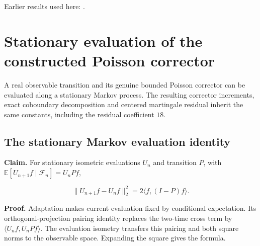 \documentclass[11pt,a4paper]{report}
\begin{document}
Earlier results used here: \cite[Section~3.26.3]{LangevinLean2026ULASC}.
\section{\texorpdfstring{Stationary evaluation of the constructed Poisson corrector}{Stationary evaluation of the constructed Poisson corrector}}
\label{proof-module-WassersteinMixing-PoissonProcess-lean}


A real observable transition and its genuine bounded Poisson corrector can be evaluated along a stationary Markov process. The resulting corrector increments, exact coboundary decomposition and centered martingale residual inherit the same constants, including the residual coefficient \(18\).

\subsection{\texorpdfstring{The stationary Markov evaluation identity}{The stationary Markov evaluation identity}}
\label{report-step-WassersteinMixing-PoissonProcess-lean-1}


\textbf{Claim.} For stationary isometric evaluations \(U_n\) and transition \(P\), with \(\mathbb E[U_{n+1}f\mid\mathcal F_n]=U_nPf\),

\[\|U_{n+1}f-U_nf\|_2^2=2\langle f,(I-P)f\rangle.\]

\textbf{Proof.} Adaptation makes current evaluation fixed by conditional expectation. Its orthogonal-projection pairing identity replaces the two-time cross term by \(\langle U_nf,U_nPf\rangle\). The evaluation isometry transfers this pairing and both square norms to the observable space. Expanding the square gives the formula.
\end{document}

